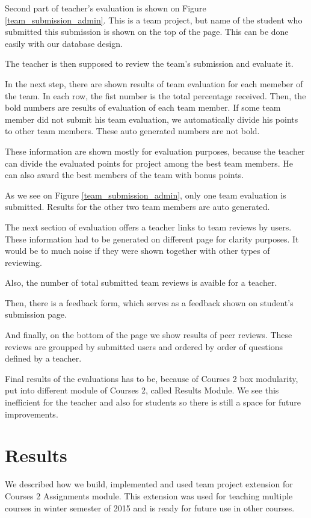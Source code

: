 Second part of teacher's evaluation is shown on Figure \ref{team_submission_admin}. This is a team project, but name of the student who submitted this submission is shown on the top of the page. This can be done easily with our database design. 

The teacher is then supposed to review the team's submission and evaluate it. 

In the next step, there are shown results of team evaluation for each memeber of the team. In each row, the fist number is the total percentage received. Then, the bold numbers are results of evaluation of each team member. If some team member did not submit his team evaluation, we automatically divide his points to other team members. These auto generated numbers are not bold.

These information are shown mostly for evaluation purposes, because the teacher can divide the evaluated points for project among the best team members. He can also award the best members of the team with bonus points.

As we see on Figure \ref{team_submission_admin}, only one team evaluation is submitted. Results for the other two team members are auto generated.

The next section of evaluation offers a teacher links to team reviews by users. These information had to be generated on different page for clarity purposes. It would be to much noise if they were shown together with other types of reviewing.

Also, the number of total submitted team reviews is avaible for a teacher.

Then, there is a feedback form, which serves as a feedback shown on student's submission page.

And finally, on the bottom of the page we show results of peer reviews. These reviews are groupped by submitted users and ordered by order of questions defined by a teacher.

Final results of the evaluations has to be, because of Courses 2 box modularity, put into different module of Courses 2, called Results Module. We see this inefficient for the teacher and also for students so there is still a space for future improvements.

\section{Results}
We described how we build, implemented and used team project extension for Courses 2 Assignments module. This extension was used for teaching multiple courses in winter semester of 2015 and is ready for future use in other courses.

